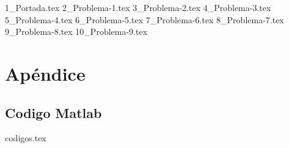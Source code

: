\documentclass[a4paper,12pt,twoside]{all-in-one} %
\begin{document}
{1_Portada.tex}
\FloatBarrier
\newpage
{2_Problema-1.tex}
\FloatBarrier 
\newpage
{3_Problema-2.tex}
\FloatBarrier 
\newpage
{4_Problema-3.tex}
\FloatBarrier 
\newpage
{5_Problema-4.tex}
\FloatBarrier 
\newpage
{6_Problema-5.tex}
\FloatBarrier 
\newpage
{7_Problema-6.tex}
\FloatBarrier 
\newpage
{8_Problema-7.tex}
\FloatBarrier 
\newpage
{9_Problema-8.tex}
\FloatBarrier 
\newpage
{10_Problema-9.tex}
\FloatBarrier 
\newpage

\appendix
\section{Apéndice} 
\subsection{Codigo Matlab} 
{codigos.tex}

\pagestyle{\auxsettings}
\printbibliography[heading=bibintoc]
\end{document}
